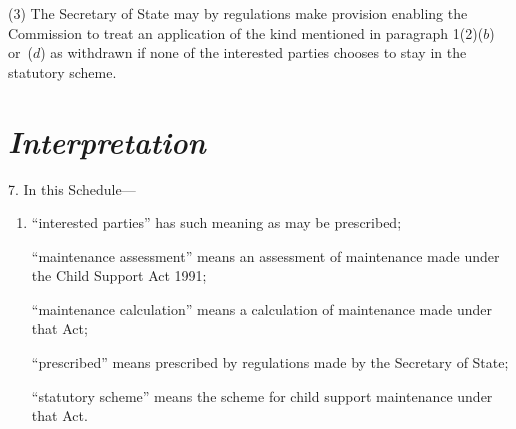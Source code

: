 \documentclass[12pt,a4paper]{article}
\begin{document}
(3) The Secretary of State may by regulations make provision enabling the Commission to treat an application of the kind mentioned in paragraph 1(2)($b$) or~($d$) as withdrawn if none of the interested parties chooses to stay in the statutory scheme.

\section*{\itshape Interpretation}

7. In this Schedule—
\begin{enumerate}\item[]
    “interested parties” has such meaning as may be prescribed;

    “maintenance assessment” means an assessment of maintenance made under the Child Support Act 1991;

    “maintenance calculation” means a calculation of maintenance made under that Act;

    “prescribed” means prescribed by regulations made by the Secretary of State;

    “statutory scheme” means the scheme for child support maintenance under that Act. 
\end{enumerate}

\end{document}
